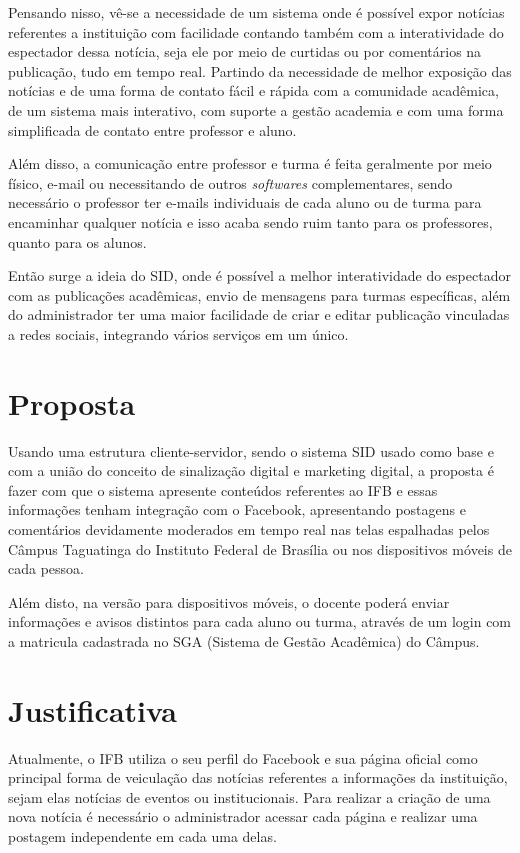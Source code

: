 Pensando nisso, vê-se a necessidade de um sistema onde é possível expor notícias referentes a instituição com facilidade contando também com a interatividade do espectador dessa notícia, seja ele por meio de curtidas ou por comentários na publicação, tudo em tempo real. Partindo da necessidade de melhor exposição das notícias e de uma forma de contato fácil e rápida com a comunidade acadêmica, de um sistema mais interativo, com suporte a gestão academia e com uma forma simplificada de contato entre professor e aluno. 

Além disso, a comunicação entre professor e turma é feita geralmente por meio físico, e-mail ou necessitando de outros \textit{softwares} complementares, sendo necessário o professor ter e-mails individuais de cada aluno ou de turma para encaminhar qualquer notícia e isso acaba sendo ruim tanto para os professores, quanto para os alunos. 

Então surge a ideia do SID, onde é possível a melhor interatividade do espectador com as publicações acadêmicas, envio de mensagens para turmas específicas, além do administrador ter uma maior facilidade de criar e editar publicação vinculadas a redes sociais, integrando vários serviços em um único.

\section{Proposta}
Usando uma estrutura cliente-servidor, sendo o sistema SID usado como base e com a união do conceito de sinalização digital e marketing digital, a proposta é fazer com que o sistema apresente conteúdos referentes ao IFB e essas informações tenham integração com o Facebook, apresentando postagens e comentários devidamente moderados em tempo real nas  telas espalhadas pelos Câmpus Taguatinga do Instituto Federal de Brasília ou nos dispositivos móveis de cada pessoa. 

Além disto, na versão para dispositivos móveis, o docente poderá enviar informações e avisos distintos para cada aluno ou turma, através de um login com a matricula cadastrada no SGA (Sistema de Gestão Acadêmica) do Câmpus.

\section{Justificativa}
Atualmente, o IFB utiliza o seu perfil do Facebook e sua página oficial como principal forma de veiculação das notícias referentes a informações da instituição, sejam elas notícias de eventos ou institucionais. Para realizar a criação de uma nova notícia é necessário o administrador acessar cada página e realizar uma postagem independente em cada uma delas. 

